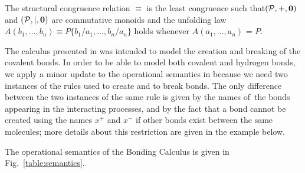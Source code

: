 \documentclass[runningheads]{llncs}
\newcommand{\mP}{\mathcal{P}}
\begin{document}
The structural congruence relation $\equiv$ is the least congruence such 
that\linebreak $(\mP,+,{\bf 0})$ and $(\mP,\mid,{\bf 0})$ are commutative monoids 
and the unfolding law\linebreak  $A(b_1,\ldots,b_n) \equiv 
P\{b_1/a_1,\ldots,b_n/a_n\}$ holds whenever $A(a_1,\ldots,a_n)$ = $P$.

The calculus presented in \cite{NaCo18} was intended to model the 
creation and breaking of the covalent bonds. In order to be able to model 
both covalent and hydrogen bonds, we apply a minor update to the 
operational semantics in \cite{NaCo18} because we need two instances of the 
rules used to create and to break bonds. The only difference between the 
two instances of the same rule is given by the names of~the bonds 
appearing in the interacting processes, and by the fact that a bond cannot 
be created using the names $x^+$ and $x^-$ if other bonds exist between 
the same molecules; more details about this restriction are given in 
the example below.

The operational semantics of the Bonding Calculus is given in Fig.~\ref{table:semantics}.
\end{document}
